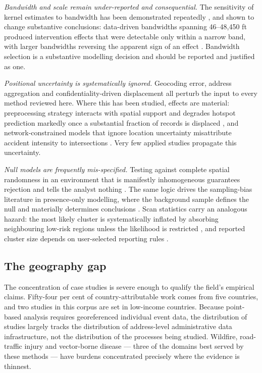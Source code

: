 \documentclass[11pt,a4paper]{article}
\begin{document}
\emph{Bandwidth and scale remain under-reported and consequential.} The
sensitivity of kernel estimates to bandwidth has been demonstrated repeatedly
\citep{chainey2014,hart2014,amatulli2007}, and shown to change substantive
conclusions: data-driven bandwidths spanning 46--48{,}450 ft produced
intervention effects that were detectable only within a narrow band, with
larger bandwidths reversing the apparent sign of an effect
\citep{zewdie2025}. Bandwidth selection is a substantive modelling decision
and should be reported and justified as one.

\emph{Positional uncertainty is systematically ignored.} Geocoding error,
address aggregation and confidentiality-driven displacement all perturb the
input to every method reviewed here. Where this has been studied, effects are
material: preprocessing strategy interacts with spatial support and degrades
hotspot prediction markedly once a substantial fraction of records is
displaced \citep{wang2026}, and network-constrained models that ignore
location uncertainty misattribute accident intensity to intersections
\citep{brizredon2023}. Very few applied studies propagate this uncertainty.

\emph{Null models are frequently mis-specified.} Testing against complete
spatial randomness in an environment that is manifestly inhomogeneous
guarantees rejection and tells the analyst nothing
\citep{law2009,wiegand2007,velazquez2016}. The same logic drives the
sampling-bias literature in presence-only modelling, where the background
sample defines the null and materially determines conclusions
\citep{phillips2009,fourcade2014,yackulic2013,elgabbas2018}. Scan statistics
carry an analogous hazard: the most likely cluster is systematically inflated
by absorbing neighbouring low-risk regions unless the likelihood is restricted
\citep{tango2021,tango2012}, and reported cluster size depends on
user-selected reporting rules \citep{han2016a}.

\subsection{The geography gap}
The concentration of case studies is severe enough to qualify the field's
empirical claims. Fifty-four per cent of country-attributable work comes from
five countries, and two studies in this corpus are set in low-income
countries. Because point-based analysis requires georeferenced individual
event data, the distribution of studies largely tracks the distribution of
address-level administrative data infrastructure, not the distribution of the
processes being studied. Wildfire, road-traffic injury and vector-borne
disease --- three of the domains best served by these methods --- have burdens
concentrated precisely where the evidence is thinnest.
\end{document}
